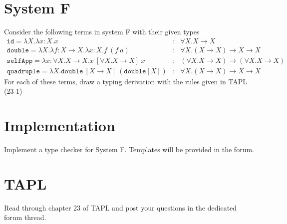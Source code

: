 \section{System F}
Consider the following terms in system F with their given types
\[
\begin{array}{lcr}
\mathtt{id} =\lambda X.\lambda x:X.x &:& \forall X.X\rightarrow X\\
\mathtt{double} = \lambda X.\lambda f:X\rightarrow X.\lambda x:X. f\ (f\ a) &:& \forall X.(X\rightarrow X)\rightarrow X\rightarrow X\\
\mathtt{selfApp} = \lambda x:\forall X.X\rightarrow X. x\ [\forall X.X\rightarrow X]\ x &:& (\forall X.X\rightarrow X) \rightarrow (\forall X.X\rightarrow X)\\
\mathtt{quadruple} = \lambda X.\mathtt{double}\ [X\rightarrow X]\ (\mathtt{double} [X]) &:&\forall X.(X\rightarrow X)\rightarrow X\rightarrow X
\end{array}
\]
For each of these terms, draw a typing derivation with the rules given in TAPL (23-1)

\section{Implementation}
Implement a type checker for System F.
Templates will be provided in the forum.

\section{TAPL}
Read through chapter 23 of TAPL and post your questions in the dedicated forum thread.
